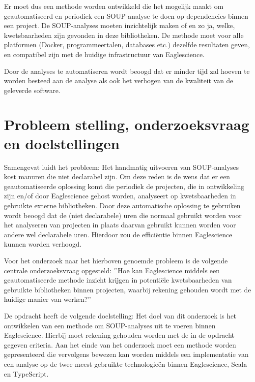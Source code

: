 Er moet dus een methode worden ontwikkeld die het mogelijk maakt om geautomatiseerd en periodiek een SOUP-analyse te doen op dependencies binnen een project. De SOUP-analyses moeten inzichtelijk maken of en zo ja, welke, kwetsbaarheden zijn gevonden in deze bibliotheken. De methode moet voor alle platformen (Docker, programmeertalen, databases etc.) dezelfde resultaten geven, en compatibel zijn met de huidige infrastructuur van Eaglescience.

Door de analyses te automatiseren wordt beoogd dat er minder tijd zal hoeven te worden besteed aan de analyse als ook het verhogen van de kwaliteit van de geleverde software.

\section{Probleem stelling, onderzoeksvraag en doelstellingen}\label{sec:probleem-stelling-onderzoeksvraag-en-doelstellingen}
Samengevat luidt het probleem: Het handmatig uitvoeren van SOUP-analyses kost manuren die niet declarabel zijn.
Om deze reden is de wens dat er een geautomatiseerde oplossing komt die periodiek de projecten, die in ontwikkeling zijn en/of door Eaglescience gehost worden, analyseert op kwetsbaarheden in gebruikte externe bibliotheken. Door deze automatische oplossing te gebruiken wordt beoogd dat de (niet declarabele) uren die normaal gebruikt worden voor het analyseren van projecten in plaats daarvan gebruikt kunnen worden voor andere wel declarabele uren. Hierdoor zou de efficiëntie binnen Eaglescience kunnen worden verhoogd.

Voor het onderzoek naar het hierboven genoemde probleem is de volgende centrale onderzoeksvraag opgesteld: $"$Hoe kan Eaglescience middels een geautomatiseerde methode inzicht krijgen in potentiële kwetsbaarheden van gebruikte bibliotheken binnen projecten, waarbij rekening gehouden wordt met de huidige manier van werken?$"$

De opdracht heeft de volgende doelstelling:
Het doel van dit onderzoek is het ontwikkelen van een methode om SOUP-analyses uit te voeren binnen Eaglescience. Hierbij moet rekening gehouden worden met de in de opdracht gegeven criteria. Aan het einde van het onderzoek moet een methode worden gepresenteerd die vervolgens bewezen kan worden middels een implementatie van een analyse op de twee meest gebruikte technologieën binnen Eaglescience, Scala en TypeScript.



